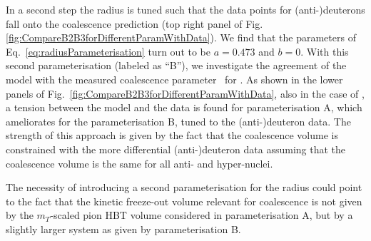 In a second step the radius is tuned such that the data points for (anti-)deuterons fall onto the coalescence prediction (top right panel of Fig. \ref{fig:CompareB2B3forDifferentParamWithData}). We find that the parameters of Eq.~\ref{eq:radiusParameterisation} turn out to be $a = 0.473$ and $b = 0$. 
With this second parameterisation (labeled as ``B''), we investigate the agreement of the model with the measured coalescence parameter \bthree\ for \hethree. As shown in the lower panels of Fig.~\ref{fig:CompareB2B3forDifferentParamWithData}, also in the case of \bthree, a tension between the model and the data is found for parameterisation A, which ameliorates for the parameterisation B, tuned to the (anti-)deuteron data. The strength of this approach is given by the fact that the coalescence volume is constrained with the more differential (anti-)deuteron data assuming that the coalescence volume is the same for all anti- and hyper-nuclei. %

The necessity of introducing a second parameterisation for the radius could point to the fact that the kinetic freeze-out volume relevant for coalescence is not given by the $m_{T}$-scaled pion HBT volume considered in parameterisation A, but by a slightly larger system as given by parameterisation B.  

